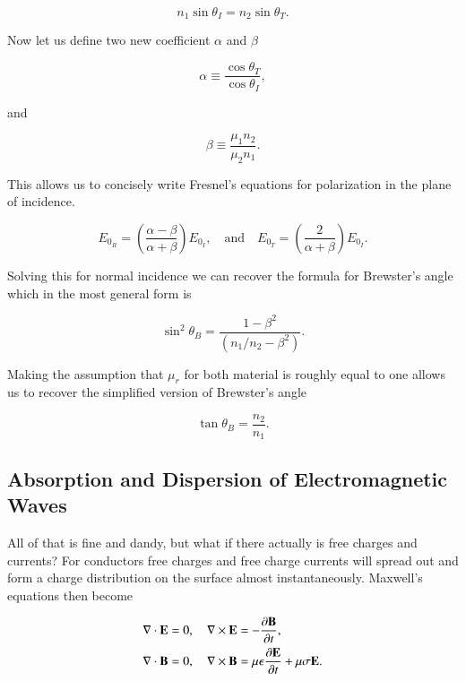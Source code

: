 \documentclass[preprint, review,12pt]{elsarticle}
\def\x{\times}
\def\.{\cdot}
\def\b{\textbf}
\def\={\equiv}
\def\div{\nabla \.}
\def\curl{\nabla \x}
\def\and{\quad \text{and} \quad}
\def\9{\left(}
\def\0{\right)}
\newcommand{\pd}[2]{\frac{\partial #1 }{\partial #2}}
\begin{document}
\begin{equation}
      n_1 \sin\theta_I = n_2\sin\theta_T.
\end{equation}

Now let us define two new coefficient $\alpha$ and $\beta$

\begin{equation}
    \alpha \= \frac{\cos\theta_T}{\cos\theta_I},
\end{equation}

and

\begin{equation}
    \beta \= \frac{\mu_1n_2}{\mu_2n_1}.
\end{equation}

This allows us to concisely write Fresnel's equations for polarization in the plane of incidence. 

\begin{equation}
    E_{0_R} = \9 \frac{\alpha - \beta}{\alpha + \beta} \0 E_{0_I}, \and E_{0_T} = \9\frac{2}{\alpha + \beta}\0 E_{0_I}.
\end{equation}

Solving this for normal incidence we can recover the formula for Brewster's angle which in the most general form is

\begin{equation}
    \sin^2\theta_B = \frac{1-\beta^2}{(n_1/n_2 -\beta^2)}.
\end{equation}

Making the assumption that $\mu_r$ for both material is roughly equal to one allows us to recover the simplified version of Brewster's angle

\begin{equation}
    \tan\theta_B = \frac{n_2}{n_1}.
\end{equation}

\subsection{Absorption and Dispersion of Electromagnetic Waves}

 All of that is fine and dandy, but what if there actually is free charges and currents? For conductors free charges and free charge currents will spread out and form a charge distribution on the surface almost instantaneously. Maxwell's equations then become
 
\begin{equation}
\begin{split}
    & \div \b E = 0, \quad \curl \b E = -\pd{\b B}{t}, \\
    & \div \b B = 0, \quad \curl \b B = \mu \epsilon \pd{\b E}{t} + \mu \sigma \b E.
\end{split}
\end{equation}
\end{document}
